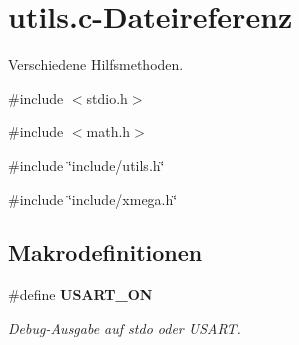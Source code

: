 \section{utils.c-\/Dateireferenz}
\label{utils_8c}


Verschiedene Hilfsmethoden.  


{\ttfamily \#include $<$stdio.h$>$}\par
{\ttfamily \#include $<$math.h$>$}\par
{\ttfamily \#include \char`\"{}include/utils.h\char`\"{}}\par
{\ttfamily \#include \char`\"{}include/xmega.h\char`\"{}}\par
\subsection*{Makrodefinitionen}
\begin{DoxyCompactItemize}
\item 
\#define {\bf USART\_\-ON}
\begin{DoxyCompactList}\small\item\em Debug-\/Ausgabe auf stdo oder USART. \item\end{DoxyCompactList}\end{DoxyCompactItemize}

